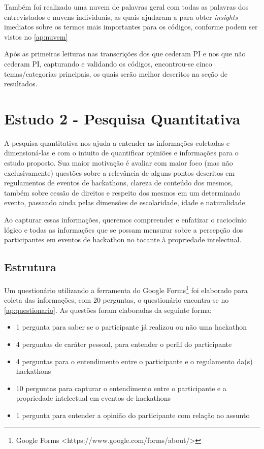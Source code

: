 Também foi realizado uma nuvem de palavras geral com todas as palavras dos entrevistados e nuvens individuais, as quais ajudaram a para obter \textit{insights} imediatos sobre os termos mais importantes para os códigos, conforme podem ser vistos no \autoref{ap:nuvem}

Após as primeiras leituras nas transcrições dos que cederam PI e nos que não cederam PI, capturando e validando os códigos, encontrou-se cinco temas/categorias principais, os quais serão melhor descritos na seção de resultados. 







\section{Estudo 2 - Pesquisa Quantitativa}

A pesquisa quantitativa nos ajuda a entender as informações coletadas e dimensioná-las e com o intuito de quantificar opiniões e informações para o estudo proposto.
Sua maior motivação é avaliar com maior foco (mas não exclusivamente) questões sobre a relevância de alguns pontos descritos em regulamentos de eventos de hackathons, clareza de conteúdo dos mesmos, também sobre cessão de direitos e respeito dos mesmos em um determinado evento, passando ainda pelas dimensões de escolaridade, idade e naturalidade. 

Ao capturar essas informações, queremos compreender e enfatizar o raciocínio lógico e todas as informações que se possam mensurar sobre a percepção dos participantes em eventos de hackathon no tocante à propriedade intelectual.

\subsection{Estrutura}

Um questionário utilizando a ferramenta do Google Forms\footnote{ Google Forms <https://www.google.com/forms/about/> 
} foi elaborado para coleta das informações, com 20 perguntas, o questionário encontra-se no \autoref{ap:questionario}. As questões foram elaboradas da seguinte forma:
\begin{itemize}
   \item 1 pergunta para saber se o participante já realizou ou não uma hackathon
   \item 4 perguntas de caráter pessoal, para entender o perfil do participante
   \item 4 perguntas para o entendimento entre o participante e o regulamento da(s) hackathons
   \item 10 perguntas para capturar o entendimento entre o participante e a propriedade intelectual em eventos de hackathons
   \item 1 pergunta para entender a opinião do participante com relação ao assunto
     
\end{itemize}
   
